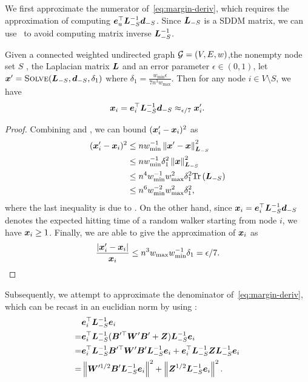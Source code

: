 \documentclass[sigconf]{acmart}
\begin{document}
We first approximate the numerator of~\eqref{eq:margin-deriv}, which requires the approximation of computing \(\boldsymbol{e}_u^\top\boldsymbol{L}_{-S}^{-1}\boldsymbol{d}_{-S}\).
Since \(\boldsymbol{L}_{-S}\) is a SDDM matrix, we can use~ to avoid computing matrix inverse \(\boldsymbol{L}_{-S}^{-1}\).
\begin{lemma}\label{lem:approx-numer}
    Given a connected weighted undirected graph \(\mathcal{G}=(V,E,w)\),the nonempty node set \(S\) , the Laplacian matrix \(\boldsymbol{L}\) and an error parameter \(\epsilon\in(0,1)\), let \(\boldsymbol{x}'=\textsc{Solve}(\boldsymbol{L}_{-S},\boldsymbol{d}_{-S},\delta_1)\) where \(\delta_1=\frac{w_{\min}\epsilon}{7n^3w_{\max}}\). Then for any node \(i\in V\setminus S\), we have
    \begin{equation}\label{eq:approx-numer}
        \boldsymbol{x}_i=\boldsymbol{e}_i^\top\boldsymbol{L}_{-S}^{-1}\boldsymbol{d}_{-S}\approx_{\epsilon/7}\boldsymbol{x}'_i.
    \end{equation}
\end{lemma}
\begin{proof}

    Combining  and , we can bound \((\boldsymbol{x}'_i-\boldsymbol{x}_i)^2\) as
    \begin{align*}
        (\boldsymbol{x}'_i-\boldsymbol{x}_i)^2
         & \le nw_{\min}^{-1}\left\Vert\boldsymbol{x}'-\boldsymbol{x}\right\Vert^2_{\boldsymbol{L}_{-S}}        \\
         & \le nw_{\min}^{-1}\delta_1^2\left\Vert\boldsymbol{x}\right\Vert^2_{\boldsymbol{L}_{-S}}     \\
         & \le n^4w_{\min}^{-1}w_{\max}^2\delta_1^2\mathrm{Tr}\left(\boldsymbol{L}_{-S}\right) \\
         & \le n^6w_{\min}^{-2}w_{\max}^2\delta_1^2,
    \end{align*}
    where the last inequality is due to .
    On the other hand, since \(\boldsymbol{x}_i=\boldsymbol{e}_i^\top\boldsymbol{L}_{-S}^{-1}\boldsymbol{d}_{-S}\) denotes the expected hitting time of a random walker starting from node \(i\), we have \(\boldsymbol{x}_i\ge1\).
    Finally, we are able to give the approximation of \(\boldsymbol{x}_i\) as
    \[\frac{\left|\boldsymbol{x}'_i-\boldsymbol{x}_i \right|}{\boldsymbol{x}_i}\le n^3w_{\max}w_{\min}^{-1}\delta_1=\epsilon/7.\]
\end{proof}

Subsequently, we attempt to approximate the denominator of~\eqref{eq:margin-deriv}, which can be recast in an euclidian norm by using :
\begin{equation}\label{eq:denom-solver}
    \begin{split}
        &\boldsymbol{e}_i^\top\boldsymbol{L}_{-S}^{-1}\boldsymbol{e}_i\\
        =&\boldsymbol{e}_i^\top\boldsymbol{L}_{-S}^{-1}(\boldsymbol{B}'^\top\boldsymbol{W}'\boldsymbol{B}'+\boldsymbol{Z})\boldsymbol{L}_{-S}^{-1}\boldsymbol{e}_i\\
        =&\boldsymbol{e}_i^\top\boldsymbol{L}_{-S}^{-1}\boldsymbol{B}'^\top\boldsymbol{W}'\boldsymbol{B}'\boldsymbol{L}_{-S}^{-1}\boldsymbol{e}_i+\boldsymbol{e}_i^\top\boldsymbol{L}_{-S}^{-1}\boldsymbol{Z}\boldsymbol{L}_{-S}^{-1}\boldsymbol{e}_i\\
        =&\left\Vert\boldsymbol{W}'^{1/2}\boldsymbol{B}'\boldsymbol{L}_{-S}^{-1}\boldsymbol{e}_i\right\Vert^2+\left\Vert\boldsymbol{Z}^{1/2}\boldsymbol{L}_{-S}^{-1}\boldsymbol{e}_i\right\Vert^2.
    \end{split}
\end{equation}
\end{document}
